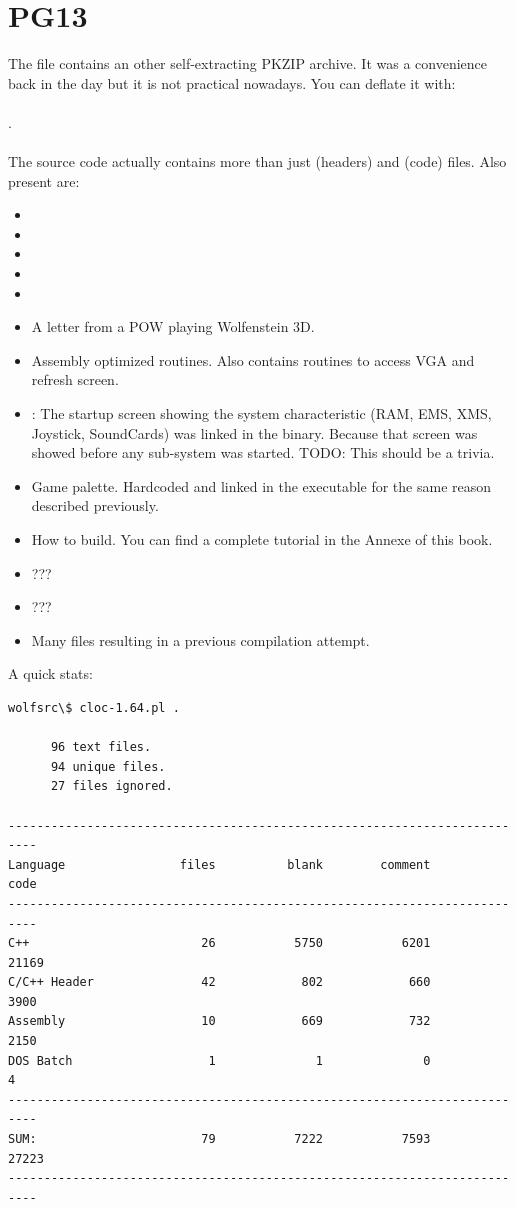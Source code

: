 \documentclass[book.tex]{subfiles}
\begin{document}
\section{PG13}
The file  contains an other self-extracting PKZIP archive. It was a convenience back in the day but it is not practical nowadays. You can deflate it with:\\
\\.\\
\\The source code actually contains more than just  (headers) and  (code) files. Also present are:
\begin{itemize}
\item {}
\item {}
\item {}
\item {}
\item {}
\item {} A letter from a POW playing Wolfenstein 3D.
\item {} Assembly optimized routines. Also contains  routines to access VGA and refresh screen.
\item {}: The startup screen showing the system characteristic (RAM, EMS, XMS, Joystick, SoundCards) was linked in the binary. Because that screen was showed before any sub-system was started. TODO: This should be a trivia.
\item {} Game palette. Hardcoded and linked in the executable for the same reason described previously.
\item {} How to build. You can find a complete tutorial in the Annexe of this book.
\item {} ???
\item {} ???
\item Many files resulting in a previous compilation attempt.
\end{itemize}
A quick stats:\\
\begin{verbatim}
wolfsrc\$ cloc-1.64.pl .

      96 text files.
      94 unique files.                              
      27 files ignored.

--------------------------------------------------------------------------
Language                files          blank        comment           code
--------------------------------------------------------------------------
C++                        26           5750           6201          21169
C/C++ Header               42            802            660           3900
Assembly                   10            669            732           2150
DOS Batch                   1              1              0              4
--------------------------------------------------------------------------
SUM:                       79           7222           7593          27223
--------------------------------------------------------------------------
\end{verbatim}
\end{document}
